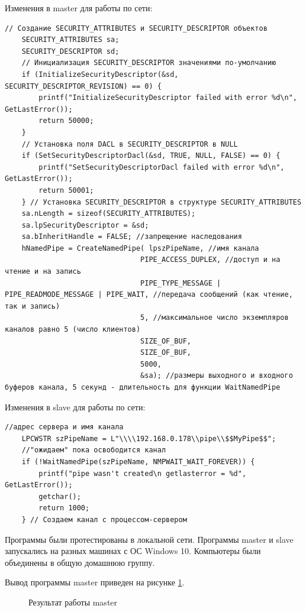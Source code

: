 \documentclass[a4paper]{article}
\begin{document}
	Изменения в master для работы по сети:
	\begin{lstlisting}[style=crs_cpp]
	// Создание SECURITY_ATTRIBUTES и SECURITY_DESCRIPTOR объектов 
	SECURITY_ATTRIBUTES sa; 
	SECURITY_DESCRIPTOR sd;
	// Инициализация SECURITY_DESCRIPTOR значениями по-умолчанию 
	if (InitializeSecurityDescriptor(&sd, SECURITY_DESCRIPTOR_REVISION) == 0) {
		printf("InitializeSecurityDescriptor failed with error %d\n", GetLastError());
		return 50000; 
	}
	// Установка поля DACL в SECURITY_DESCRIPTOR в NULL
	if (SetSecurityDescriptorDacl(&sd, TRUE, NULL, FALSE) == 0) {
		printf("SetSecurityDescriptorDacl failed with error %d\n", GetLastError()); 
		return 50001;
	} // Установка SECURITY_DESCRIPTOR в структуре SECURITY_ATTRIBUTES
	sa.nLength = sizeof(SECURITY_ATTRIBUTES);
	sa.lpSecurityDescriptor = &sd; 
	sa.bInheritHandle = FALSE; //запрещение наследования
	hNamedPipe = CreateNamedPipe( lpszPipeName, //имя канала
								PIPE_ACCESS_DUPLEX, //доступ и на чтение и на запись 
								PIPE_TYPE_MESSAGE | PIPE_READMODE_MESSAGE | PIPE_WAIT, //передача сообщений (как чтение, так и запись) 
								5, //максимальное число экземпляров каналов равно 5 (число клиентов)
								SIZE_OF_BUF, 
								SIZE_OF_BUF, 
								5000, 
								&sa); //размеры выходного и входного буферов канала, 5 секунд - длительность для функции WaitNamedPipe
	\end{lstlisting}
	
	Изменения в slave для работы по сети:
	\begin{lstlisting}[style=crs_cpp]
//адрес сервера и имя канала 
	LPCWSTR szPipeName = L"\\\\192.168.0.178\\pipe\\$$MyPipe$$";
	//"ожидаем" пока освободится канал 
	if (!WaitNamedPipe(szPipeName, NMPWAIT_WAIT_FOREVER)) {
		printf("pipe wasn't created\n getlasterror = %d", GetLastError()); 
		getchar(); 
		return 1000; 
	} // Создаем канал с процессом-сервером
	\end{lstlisting}
	
	Программы были протестированы в локальной сети. Программы master и slave запускались на разных машинах с ОС Windows 10. Компьютеры были объединены в общую домашнюю группу.
	
	Вывод программы master приведен на рисунке \ref{img:task5m}.
	\begin{figure}[h!]
		\caption{Результат работы master}
		\label{img:task5m}
	\end{figure}
	
\end{document}
